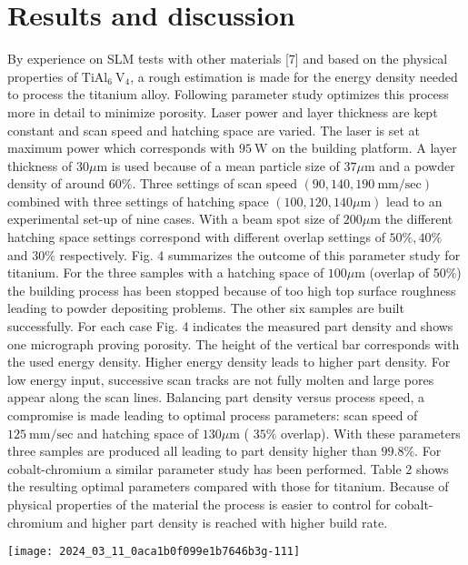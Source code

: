 \documentclass[10pt]{article}
\begin{document}
\section*{Results and discussion}
By experience on SLM tests with other materials [7] and based on the physical properties of $\mathrm{TiAl}_{6} \mathrm{~V}_{4}$, a rough estimation is made for the energy density needed to process the titanium alloy. Following parameter study optimizes this process more in detail to minimize porosity. Laser power and layer thickness are kept constant and scan speed and hatching space are varied. The laser is set at maximum power which corresponds with $95 \mathrm{~W}$ on the building platform. A layer thickness of $30 \mu \mathrm{m}$ is used because of a mean particle size of $37 \mu \mathrm{m}$ and a powder density of around $60 \%$. Three settings of scan speed $(90,140,190 \mathrm{~mm} / \mathrm{sec})$ combined with three settings of hatching space $(100,120,140 \mu \mathrm{m})$ lead to an experimental set-up of nine cases. With a beam spot size of $200 \mu \mathrm{m}$ the different hatching space settings correspond with different overlap settings of $50 \%, 40 \%$ and $30 \%$ respectively. Fig. 4 summarizes the outcome of this parameter study for titanium. For the three samples with a hatching space of $100 \mu \mathrm{m}$ (overlap of 50\%) the building process has been stopped because of too high top surface roughness leading to powder depositing problems. The other six samples are built successfully. For each case Fig. 4 indicates the measured part density and shows one micrograph proving porosity. The height of the vertical bar corresponds with the used energy density. Higher energy density leads to higher part density. For low energy input, successive scan tracks are not fully molten and large pores appear along the scan lines. Balancing part density versus process speed, a compromise is made leading to optimal process parameters: scan speed of $125 \mathrm{~mm} / \mathrm{sec}$ and hatching space of $130 \mu \mathrm{m}$ ( $35 \%$ overlap). With these parameters three samples are produced all leading to part density higher than $99.8 \%$. For cobalt-chromium a similar parameter study has been performed. Table 2 shows the resulting optimal parameters compared with those for titanium. Because of physical properties of the material the process is easier to control for cobalt-chromium and higher part density is reached with higher build rate.

\begin{center}
\texttt{[image: 2024\_03\_11\_0aca1b0f099e1b7646b3g-111]}
\end{center}
\end{document}
